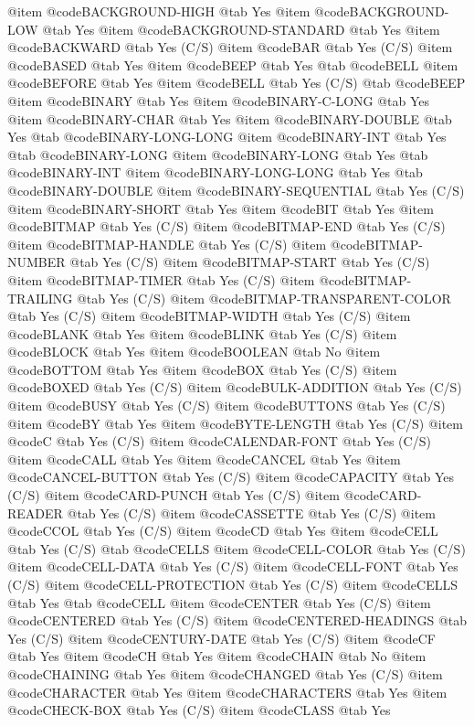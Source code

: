 @item @code{BACKGROUND-HIGH} @tab Yes
@item @code{BACKGROUND-LOW} @tab Yes
@item @code{BACKGROUND-STANDARD} @tab Yes
@item @code{BACKWARD} @tab Yes (C/S)
@item @code{BAR} @tab Yes (C/S)
@item @code{BASED} @tab Yes
@item @code{BEEP} @tab Yes @tab @code{BELL}
@item @code{BEFORE} @tab Yes
@item @code{BELL} @tab Yes (C/S) @tab @code{BEEP}
@item @code{BINARY} @tab Yes
@item @code{BINARY-C-LONG} @tab Yes
@item @code{BINARY-CHAR} @tab Yes
@item @code{BINARY-DOUBLE} @tab Yes @tab @code{BINARY-LONG-LONG}
@item @code{BINARY-INT} @tab Yes @tab @code{BINARY-LONG}
@item @code{BINARY-LONG} @tab Yes @tab @code{BINARY-INT}
@item @code{BINARY-LONG-LONG} @tab Yes @tab @code{BINARY-DOUBLE}
@item @code{BINARY-SEQUENTIAL} @tab Yes (C/S)
@item @code{BINARY-SHORT} @tab Yes
@item @code{BIT} @tab Yes
@item @code{BITMAP} @tab Yes (C/S)
@item @code{BITMAP-END} @tab Yes (C/S)
@item @code{BITMAP-HANDLE} @tab Yes (C/S)
@item @code{BITMAP-NUMBER} @tab Yes (C/S)
@item @code{BITMAP-START} @tab Yes (C/S)
@item @code{BITMAP-TIMER} @tab Yes (C/S)
@item @code{BITMAP-TRAILING} @tab Yes (C/S)
@item @code{BITMAP-TRANSPARENT-COLOR} @tab Yes (C/S)
@item @code{BITMAP-WIDTH} @tab Yes (C/S)
@item @code{BLANK} @tab Yes
@item @code{BLINK} @tab Yes (C/S)
@item @code{BLOCK} @tab Yes
@item @code{BOOLEAN} @tab No
@item @code{BOTTOM} @tab Yes
@item @code{BOX} @tab Yes (C/S)
@item @code{BOXED} @tab Yes (C/S)
@item @code{BULK-ADDITION} @tab Yes (C/S)
@item @code{BUSY} @tab Yes (C/S)
@item @code{BUTTONS} @tab Yes (C/S)
@item @code{BY} @tab Yes
@item @code{BYTE-LENGTH} @tab Yes (C/S)
@item @code{C} @tab Yes (C/S)
@item @code{CALENDAR-FONT} @tab Yes (C/S)
@item @code{CALL} @tab Yes
@item @code{CANCEL} @tab Yes
@item @code{CANCEL-BUTTON} @tab Yes (C/S)
@item @code{CAPACITY} @tab Yes (C/S)
@item @code{CARD-PUNCH} @tab Yes (C/S)
@item @code{CARD-READER} @tab Yes (C/S)
@item @code{CASSETTE} @tab Yes (C/S)
@item @code{CCOL} @tab Yes (C/S)
@item @code{CD} @tab Yes
@item @code{CELL} @tab Yes (C/S) @tab @code{CELLS}
@item @code{CELL-COLOR} @tab Yes (C/S)
@item @code{CELL-DATA} @tab Yes (C/S)
@item @code{CELL-FONT} @tab Yes (C/S)
@item @code{CELL-PROTECTION} @tab Yes (C/S)
@item @code{CELLS} @tab Yes @tab @code{CELL}
@item @code{CENTER} @tab Yes (C/S)
@item @code{CENTERED} @tab Yes (C/S)
@item @code{CENTERED-HEADINGS} @tab Yes (C/S)
@item @code{CENTURY-DATE} @tab Yes (C/S)
@item @code{CF} @tab Yes
@item @code{CH} @tab Yes
@item @code{CHAIN} @tab No
@item @code{CHAINING} @tab Yes
@item @code{CHANGED} @tab Yes (C/S)
@item @code{CHARACTER} @tab Yes
@item @code{CHARACTERS} @tab Yes
@item @code{CHECK-BOX} @tab Yes (C/S)
@item @code{CLASS} @tab Yes
